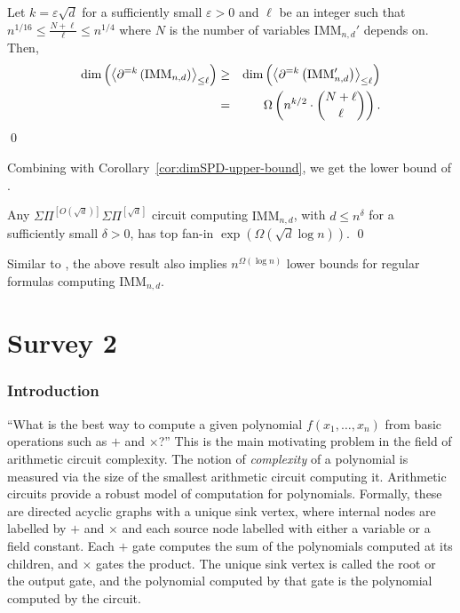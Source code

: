 \documentclass[12pt]{report}
\newcommand{\SPD}[3]{\inangle{\partial^{=#1}\inparen{#3}}_{\leq #2}}
\newcommand{\mySPSP}[2]{\Sigma\Pi^{[#1]}\Sigma\Pi^{[#2]}}
\renewcommand{\epsilon}{\varepsilon}
\begin{document}
\begin{theorem}Let $k = \epsilon\sqrt{d}$ for a sufficiently small $\epsilon > 0$ and $\ell$ be an integer such that $n^{1/16} \leq \frac{N + \ell}{\ell} \leq n^{1/4}$ where $N$ is the number of variables $\mathrm{IMM}_{n,d}'$ depends on. Then, 
\begin{eqnarray*}
\dim\inparen{\SPD{k}{\ell}{\mathrm{IMM}_{n,d}}} &\geq& \dim\inparen{\SPD{k}{\ell}{\mathrm{IMM}'_{n,d}}} \\
& =& \Omega\inparen{n^{k/2} \cdot \binom{N + \ell}{\ell}}.
\end{eqnarray*}
\qed
\end{theorem}

Combining with Corollary~\ref{cor:dimSPD-upper-bound}, we get the lower bound of \cite{FLMS13}. 

\begin{theorem}
Any $\mySPSP{O(\sqrt{d})}{\sqrt{d}}$ circuit computing $\mathrm{IMM}_{n,d}$, with $d \leq n^{\delta}$ for a sufficiently small $\delta > 0$, has top fan-in $\exp(\Omega(\sqrt{d}\log n))$. \qed
\end{theorem}

Similar to \cite{KSS13}, the above result also implies $n^{\Omega(\log n)}$ lower bounds for regular formulas computing $\mathrm{IMM}_{n,d}$. 


\part{Survey 2}



\section{Introduction} \label{sec:intro}

``What is the best way to compute a given polynomial $f(x_1,\dots, x_n)$ from basic operations such as $+$ and $\times$?'' This is the main motivating problem in the field of arithmetic circuit complexity. The notion of \emph{complexity} of a polynomial is measured via the size of the smallest arithmetic circuit computing it. Arithmetic circuits provide a robust model of computation for polynomials. Formally, these are directed acyclic graphs with a unique sink vertex, where internal nodes are labelled by $+$ and $\times$ and each source node labelled with either a variable or a field constant. Each $+$ gate computes the sum of the polynomials computed at its children, and $\times$ gates the product. The unique sink vertex is called the root or the output gate, and the polynomial computed by that gate is the polynomial computed by the circuit. 
\end{document}
